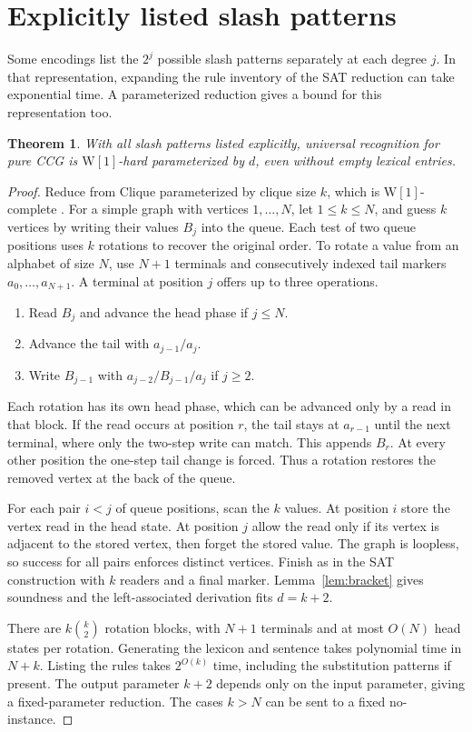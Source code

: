 \documentclass[11pt]{article}
\newtheorem{theorem}{Theorem}
\newcommand{\Wone}{\mathrm{W}[1]}
\begin{document}
\section{Explicitly listed slash patterns}

Some encodings list the \(2^j\) possible slash patterns separately at each degree \(j\). In that representation, expanding the rule inventory of the SAT reduction can take exponential time. A parameterized reduction gives a bound for this representation too.

\begin{theorem}
With all slash patterns listed explicitly, universal recognition for pure CCG is \(\Wone\)-hard parameterized by \(d\), even without empty lexical entries.
\end{theorem}

\begin{proof}
Reduce from Clique parameterized by clique size \(k\), which is \(\Wone\)-complete \citep[cor.~3.2]{downeyFellows1995}. For a simple graph with vertices \(1,\ldots,N\), let \(1\leq k\leq N\), and guess \(k\) vertices by writing their values \(B_j\) into the queue. Each test of two queue positions uses \(k\) rotations to recover the original order. To rotate a value from an alphabet of size \(N\), use \(N+1\) terminals and consecutively indexed tail markers \(a_0,\ldots,a_{N+1}\). A terminal at position \(j\) offers up to three operations.
\begin{enumerate}
  \item Read \(B_j\) and advance the head phase if \(j\leq N\).
  \item Advance the tail with \(a_{j-1}/a_j\).
  \item Write \(B_{j-1}\) with \(a_{j-2}/B_{j-1}/a_j\) if \(j\geq2\).
\end{enumerate}
Each rotation has its own head phase, which can be advanced only by a read in that block. If the read occurs at position \(r\), the tail stays at \(a_{r-1}\) until the next terminal, where only the two-step write can match. This appends \(B_r\). At every other position the one-step tail change is forced. Thus a rotation restores the removed vertex at the back of the queue.

For each pair \(i<j\) of queue positions, scan the \(k\) values. At position \(i\) store the vertex read in the head state. At position \(j\) allow the read only if its vertex is adjacent to the stored vertex, then forget the stored value. The graph is loopless, so success for all pairs enforces distinct vertices. Finish as in the SAT construction with \(k\) readers and a final marker. Lemma~\ref{lem:bracket} gives soundness and the left-associated derivation fits \(d=k+2\).

There are \(k\binom{k}{2}\) rotation blocks, with \(N+1\) terminals and at most \(O(N)\) head states per rotation. Generating the lexicon and sentence takes polynomial time in \(N+k\). Listing the rules takes \(2^{O(k)}\) time, including the substitution patterns if present. The output parameter \(k+2\) depends only on the input parameter, giving a fixed-parameter reduction. The cases \(k>N\) can be sent to a fixed no-instance.
\end{proof}
\end{document}
